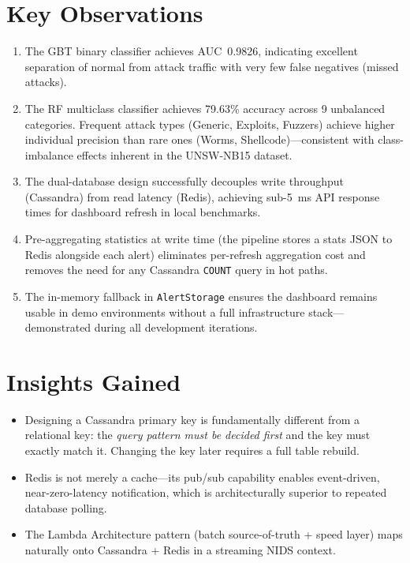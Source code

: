 \documentclass[12pt,a4paper]{report}
\begin{document}
\section{Key Observations}
\begin{enumerate}
  \item The GBT binary classifier achieves AUC~0.9826, indicating excellent
        separation of normal from attack traffic with very few false negatives
        (missed attacks).
  \item The RF multiclass classifier achieves 79.63\% accuracy across 9
        unbalanced categories.  Frequent attack types (Generic, Exploits,
        Fuzzers) achieve higher individual precision than rare ones (Worms,
        Shellcode)---consistent with class-imbalance effects inherent in the
        UNSW-NB15 dataset.
  \item The dual-database design successfully decouples write throughput
        (Cassandra) from read latency (Redis), achieving sub-5~ms API response
        times for dashboard refresh in local benchmarks.
  \item Pre-aggregating statistics at write time (the pipeline stores a
        stats JSON to Redis alongside each alert) eliminates per-refresh
        aggregation cost and removes the need for any Cassandra \texttt{COUNT}
        query in hot paths.
  \item The in-memory fallback in \texttt{AlertStorage} ensures the dashboard
        remains usable in demo environments without a full infrastructure
        stack---demonstrated during all development iterations.
\end{enumerate}

\section{Insights Gained}
\begin{itemize}
  \item Designing a Cassandra primary key is fundamentally different from a
        relational key: the \textit{query pattern must be decided first} and
        the key must exactly match it.  Changing the key later requires a full
        table rebuild.
  \item Redis is not merely a cache---its pub/sub capability enables
        event-driven, near-zero-latency notification, which is architecturally
        superior to repeated database polling.
  \item The Lambda Architecture pattern (batch source-of-truth + speed layer)
        maps naturally onto Cassandra + Redis in a streaming NIDS context.
\end{itemize}
\end{document}
